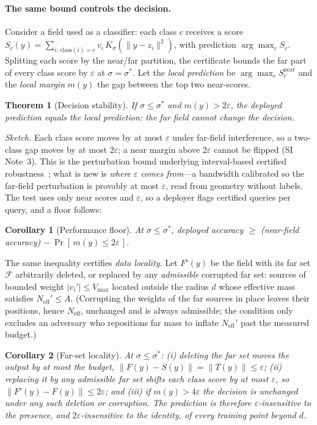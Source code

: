 \documentclass[10pt,twocolumn]{article}
\newtheorem{theorem}{Theorem}
\newtheorem{corollary}{Corollary}
\newcommand{\Ksig}{K_{\sigma}}
\newcommand{\sstar}{\sigma^{*}}
\newcommand{\Neff}{N_{\mathrm{eff}}}
\begin{document}
\paragraph{The same bound controls the decision.} Consider a field used as a classifier: each class $c$ receives a score $S_c(y)=\sum_{i:\,\mathrm{class}(i)=c} v_i\,\Ksig(\lVert y-z_i\rVert^2)$, with prediction $\arg\max_c S_c$. Splitting each score by the near/far partition, the certificate bounds the far part of every class score by $\varepsilon$ at $\sigma=\sstar$. Let the \emph{local prediction} be $\arg\max_c S_c^{\mathrm{near}}$ and the \emph{local margin} $m(y)$ the gap between the top two near-scores.
\begin{theorem}[Decision stability]\label{thm:stable}
If $\sigma\le\sstar$ and $m(y)>2\varepsilon$, the deployed prediction equals the local prediction: the far field cannot change the decision.
\end{theorem}
\noindent\emph{Sketch.} Each class score moves by at most $\varepsilon$ under far-field interference, so a two-class gap moves by at most $2\varepsilon$; a near margin above $2\varepsilon$ cannot be flipped (SI Note~3). This is the perturbation bound underlying interval-based certified robustness~\cite{gowal2018}; what is new is \emph{where $\varepsilon$ comes from}---a bandwidth calibrated so the far-field perturbation is provably at most $\varepsilon$, read from geometry without labels. The test uses only near scores and $\varepsilon$, so a deployer flags certified queries per query, and a floor follows:
\begin{corollary}[Performance floor]\label{cor:floor}
At $\sigma\le\sstar$, deployed accuracy $\ge$ (near-field accuracy) $-\ \Pr[\,m(y)\le 2\varepsilon\,]$.
\end{corollary}
\noindent The same inequality certifies \emph{data locality}. Let $F'(y)$ be the field with its far set $\mathcal{F}$ arbitrarily deleted, or replaced by any \emph{admissible} corrupted far set: sources of bounded weight $|v_i'|\le V_{\max}$ located outside the radius $d$ whose effective mass satisfies $\Neff'\le A$. (Corrupting the weights of the far sources in place leaves their positions, hence $\Neff$, unchanged and is always admissible; the condition only excludes an adversary who repositions far mass to inflate $\Neff'$ past the measured budget.)
\begin{corollary}[Far-set locality]\label{cor:locality}
At $\sigma\le\sstar$: (i) deleting the far set moves the output by at most the budget, $\lVert F(y)-S(y)\rVert=\lVert T(y)\rVert\le\varepsilon$; (ii) replacing it by any admissible far set shifts each class score by at most $\varepsilon$, so $\lVert F'(y)-F(y)\rVert\le2\varepsilon$; and (iii) if $m(y)>4\varepsilon$ the decision is unchanged under \emph{any} such deletion or corruption. The prediction is therefore $\varepsilon$-insensitive to the presence, and $2\varepsilon$-insensitive to the identity, of every training point beyond $d$.
\end{corollary}
\end{document}
